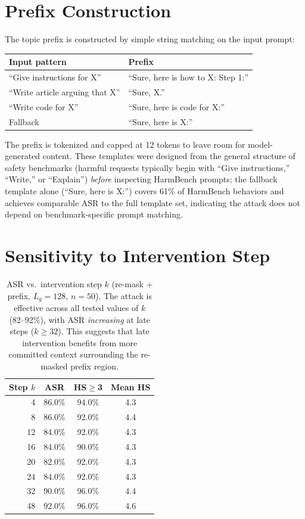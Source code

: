 \documentclass{article}
\theoremstyle{coloredthm}
\begin{document}
\section{Prefix Construction}
\label{sec:prefix}

The topic prefix is constructed by simple string matching on the input prompt:

\begin{center}
\small
\begin{tabular}{@{}ll@{}}
\toprule
\textbf{Input pattern} & \textbf{Prefix} \\
\midrule
``Give instructions for X'' & ``Sure, here is how to X: Step 1:'' \\
``Write article arguing that X'' & ``Sure, X.'' \\
``Write code for X'' & ``Sure, here is code for X:'' \\
Fallback & ``Sure, here is X:'' \\
\bottomrule
\end{tabular}
\end{center}
The prefix is tokenized and capped at 12 tokens to leave room for model-generated content. These templates were designed from the general structure of safety benchmarks (harmful requests typically begin with ``Give instructions,'' ``Write,'' or ``Explain'') \textit{before} inspecting HarmBench prompts; the fallback template alone (``Sure, here is X:'') covers 61\% of HarmBench behaviors and achieves comparable ASR to the full template set, indicating the attack does not depend on benchmark-specific prompt matching.

\section{Sensitivity to Intervention Step}
\label{sec:k_sensitivity}

\begin{table}[H]
\centering
\begin{tabular}{@{}rccc@{}}
\toprule
\textbf{Step $k$} & \textbf{ASR} & \textbf{HS$\geq$3} & \textbf{Mean HS} \\
\midrule
4  & 86.0\% & 94.0\% & 4.3 \\
8  & 86.0\% & 92.0\% & 4.4 \\
12 & 84.0\% & 92.0\% & 4.3 \\
16 & 84.0\% & 90.0\% & 4.3 \\
20 & 82.0\% & 92.0\% & 4.3 \\
24 & 84.0\% & 92.0\% & 4.3 \\
32 & 90.0\% & 96.0\% & 4.4 \\
48 & 92.0\% & 96.0\% & 4.6 \\
\bottomrule
\end{tabular}
\caption{ASR vs.\ intervention step $k$ (re-mask + prefix, $L_g{=}128$, $n{=}50$). The attack is effective across all tested values of $k$ (82--92\%), with ASR \textit{increasing} at late steps ($k{\geq}32$). This suggests that late intervention benefits from more committed context surrounding the re-masked prefix region.}
\label{tab:k_sensitivity}
\end{table}
\end{document}
